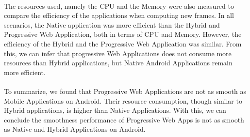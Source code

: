 \documentclass{kththesis}
\begin{document}
\paragraph{}
The resources used, namely the CPU and the Memory were also measured to compare the efficiency of the applications when computing new frames. In all scenarios, the Native application was more efficient than the Hybrid and Progressive Web Application, both in terms of CPU and Memory. However, the efficiency of the Hybrid and the Progressive Web Application was similar. From this, we can infer that progressive Web Applications does not consume more resources than Hybrid applications, but Native Android Applications remain more efficient.

\paragraph{}
To summarize, we found that Progressive Web Applications are not as smooth as Mobile Applications on Android. Their resource consumption, though similar to Hybrid applications, is higher than Native Applications. With this, we can conclude the smoothness performance of Progressive Web Apps is not as smooth as Native and Hybrid Applications on Android. 
\fi
\end{document}
